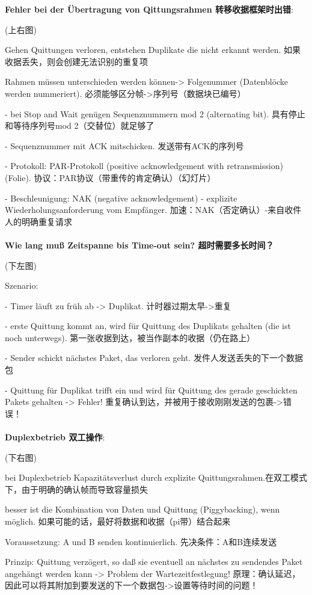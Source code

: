 \documentclass[fleqn]{article}
\begin{document}
\noindent \textbf{Fehler bei der Übertragung von Qittungsrahmen 转移收据框架时出错}:

(上右图)

Gehen Quittungen verloren, entstehen Duplikate die nicht erkannt werden. 如果收据丢失，则会创建无法识别的重复项

Rahmen müssen unterschieden werden können-> Folgenummer (Datenblöcke werden nummeriert). 必须能够区分帧->序列号（数据块已编号）

- bei Stop and Wait genügen Sequenznummern mod 2 (alternating bit). 具有停止和等待序列号mod 2（交替位）就足够了  

- Sequenznummer mit ACK mitschicken.  发送带有ACK的序列号 

- Protokoll: PAR-Protokoll (positive acknowledgement with retransmission) (Folie). 协议：PAR协议（带重传的肯定确认）（幻灯片） 

- Beschleunigung: NAK (negative acknowledgement) - explizite Wiederholungsanforderung vom Empfänger. 加速：NAK（否定确认）-来自收件人的明确重复请求 
\\
\\
\noindent \textbf{Wie lang muß Zeitspanne bis Time-out sein? 超时需要多长时间？}

(下左图)

Szenario: 

- Timer läuft zu früh ab -> Duplikat. 计时器过期太早->重复  

- erste Quittung kommt an, wird für Quittung des Duplikats gehalten (die ist noch unterwegs). 第一张收据到达，被当作副本的收据（仍在路上）

- Sender schickt nächstes Paket, das verloren geht. 发件人发送丢失的下一个数据包

- Quittung für Duplikat trifft ein und wird für Quittung des gerade geschickten Pakets gehalten -> Fehler! 
重复确认到达，并被用于接收刚刚发送的包裹->错误！ 
\\
\\
\noindent\textbf{Duplexbetrieb 双工操作}:

(下右图)

bei Duplexbetrieb Kapazitätsverlust durch explizite Quittungsrahmen.在双工模式下，由于明确的确认帧而导致容量损失 

besser ist die Kombination von Daten und Quittung (Piggybacking), wenn möglich. 如果可能的话，最好将数据和收据（pi带）结合起来

Voraussetzung: A und B senden kontinuierlich. 先决条件：A和B连续发送 

Prinzip: Quittung verzögert, so daß sie eventuell an nächstes zu sendendes Paket angehängt werden kann -> Problem der Wartezeitfestlegung!
原理：确认延迟，因此可以将其附加到要发送的下一个数据包->设置等待时间的问题！
\end{document}
